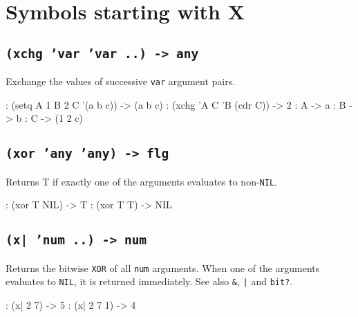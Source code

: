 %
%
%



\chapter{Symbols starting with X}
\label{cha:func-ref-X-functions-starting-with-X}
 
\section*{\texttt{(xchg 'var 'var ..) -> any}}
\label{sec:func-ref-X-(xchg 'var 'var ..) -> any}


Exchange the values of successive \texttt{var} argument pairs.


\begin{wideverbatim}
: (setq  A 1  B 2  C '(a b c))
-> (a b c)
: (xchg  'A C  'B (cdr C))
-> 2
: A
-> a
: B
-> b
: C
-> (1 2 c)
\end{wideverbatim}

 
\section*{\texttt{(xor 'any 'any) -> flg}}
\label{sec:func-ref-X-(xor 'any 'any) -> flg}


Returns T if exactly one of the arguments evaluates to non-\texttt{NIL}.


\begin{wideverbatim}
: (xor T NIL)
-> T
: (xor T T)
-> NIL
\end{wideverbatim}

 
\section*{\texttt{(x| 'num ..) -> num}}
\label{sec:func-ref-X-(x| 'num ..) -> num}


Returns the bitwise \texttt{XOR} of all \texttt{num} arguments. When one of the
arguments evaluates to \texttt{NIL}, it is returned immediately. See also \texttt{\&},
\texttt{|} and \texttt{bit?}.


\begin{wideverbatim}
: (x| 2 7)
-> 5
: (x| 2 7 1)
-> 4
\end{wideverbatim}


